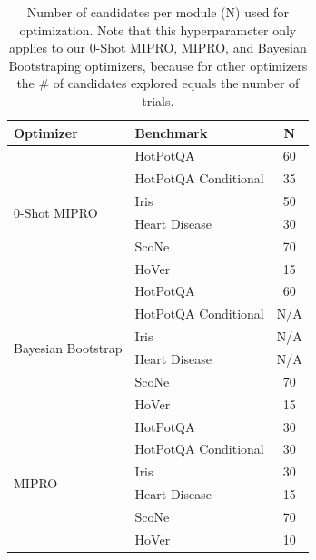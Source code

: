 \begin{table}[tp]
\begin{center}
\small
\begin{tabular}{llc}
\toprule \textbf{Optimizer} &
\textbf{Benchmark} & \textbf{N} \\ \midrule
\multirow{6}{*}{0-Shot MIPRO} & HotPotQA & 60  \\
 & HotPotQA Conditional & 35 \\
 & Iris & 50 \\
 & Heart Disease & 30  \\
 & ScoNe & 70 \\
 & HoVer & 15 \\
 \midrule
\multirow{6}{*}{Bayesian Bootstrap} & HotPotQA & 60  \\
 & HotPotQA Conditional & N/A \\
 & Iris & N/A \\
 & Heart Disease & N/A  \\
 & ScoNe & 70 \\
 & HoVer & 15 \\
 \midrule
\multirow{6}{*}{MIPRO} & HotPotQA & 30  \\
 & HotPotQA Conditional & 30 \\
 & Iris & 30 \\
 & Heart Disease & 15  \\
 & ScoNe & 70 \\
 & HoVer & 10 \\
\bottomrule
\end{tabular}
\caption{Number of candidates per module (N) used for optimization. Note that this hyperparameter only applies to our 0-Shot MIPRO, MIPRO, and Bayesian Bootstraping optimizers, because for other optimizers the \# of candidates explored equals the number of trials.}
\label{tab:opt_hyperparams}
\end{center}
\end{table}
